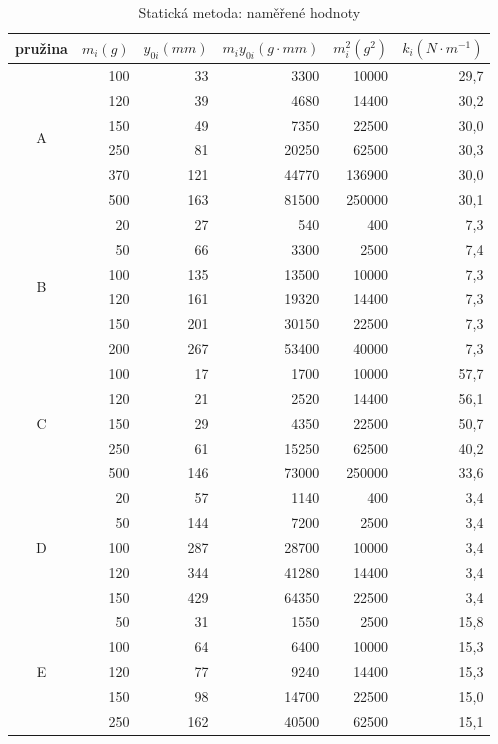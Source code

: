 \documentclass{article}
\begin{document}
\begin{table}[htbp]
\begin{center}
\begin{tabular}{|c||r|r|r|r|r|}
\hline
pružina & $m_{i} (g)$ & $y_{0i} (mm)$ & $m_{i} y_{0i} (g \cdot mm)$ & $m_{i}^{2} (g^{2})$ & $k_{i} (N \cdot m^{-1})$\\ [0.5ex]

\hline \hline
\multirow{6}{*}{\centering A} & 100 & 33 & 3300 & 10000 & 29,7 \\
& 120 & 39 & 4680 & 14400 & 30,2 \\ 
& 150 & 49 & 7350 & 22500  & 30,0\\ 
& 250 & 81 & 20250 & 62500  & 30,3\\ 
& 370 & 121 & 44770 & 136900 & 30,0\\ 
& 500 & 163 & 81500 & 250000  & 30,1\\ \hline
\multirow{6}{*}{\centering B} & 20 & 27 & 540 & 400 & 7,3\\ 
 & 50 & 66 & 3300 & 2500 & 7,4\\
 & 100 & 135 & 13500 & 10000 & 7,3\\ 
 & 120 & 161 & 19320 & 14400 & 7,3\\ 
 & 150 & 201 & 30150 & 22500 & 7,3\\ 
 & 200 & 267 & 53400 & 40000 & 7,3\\ \hline
\multirow{5}{*}{\centering C} & 100 & 17 & 1700 & 10000 & 57,7 \\
 & 120 & 21 & 2520 & 14400 & 56,1\\ 
 & 150 & 29 & 4350 & 22500 & 50,7\\ 
 & 250 & 61 & 15250 & 62500 & 40,2\\ 
 & 500 & 146 & 73000 & 250000 & 33,6\\ \hline
\multirow{5}{*}{\centering D} & 20 & 57 & 1140 & 400 & 3,4\\
 & 50 & 144 & 7200 & 2500 & 3,4\\ 
 & 100 & 287 & 28700 & 10000 & 3,4\\ 
 & 120 & 344 & 41280 & 14400 & 3,4\\ 
 & 150 & 429 & 64350 & 22500 & 3,4\\ \hline
\multirow{5}{*}{\centering E} & 50 & 31 & 1550 & 2500 & 15,8\\
 & 100 & 64 & 6400 & 10000 & 15,3\\
 & 120 & 77 & 9240 & 14400 & 15,3\\
 & 150 & 98 & 14700 & 22500 & 15,0\\
 & 250 & 162 & 40500 & 62500 & 15,1\\ \hline
\end{tabular}
\caption{Statická metoda: naměřené hodnoty}
\label{tstatikadata}

\end{center}

\end{table}
\end{document}
